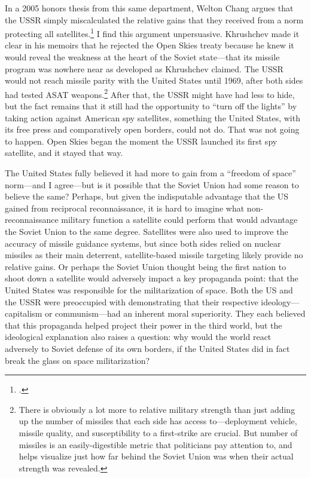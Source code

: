 \documentclass[11pt]{memoir}
\begin{document}
In a 2005 honors thesis from this same department, Welton Chang argues that the USSR simply miscalculated the relative gains that they received from a norm protecting all satellites.\footcite[Welton Chang is now a senior associate at the Center for Strategic and International Studies, and received a Ph.D. in Psychology from the University of Pennsylvania, where he studied judgement and decisionmaking. Professor Valentino provided me with his honors work, and it has been invaluable in shaping my understanding of the politics of satellites and anti-satellite weapons.]{chang_all_2005} I find this argument unpersuasive. Khrushchev made it clear in his memoirs that he rejected the Open Skies treaty because he knew it would reveal the weakness at the heart of the Soviet state---that its missile program was nowhere near as developed as Khrushchev claimed. The USSR would not reach missile parity with the United States until 1969, after both sides had tested ASAT weapons.\footnote{There is obviously a lot more to relative military strength than just adding up the number of missiles that each side has access to---deployment vehicle, missile quality, and susceptibility to a first-strike are crucial. But number of missiles is an easily-digestible metric that politicians pay attention to, and helps visualize just how far behind the Soviet Union was when their actual strength was revealed.} After that, the USSR might have had less to hide, but the fact remains that it still had the opportunity to ``turn off the lights'' by taking action against American spy satellites, something the United States, with its free press and comparatively open borders, could not do. That was not going to happen. Open Skies began the moment the USSR launched its first spy satellite, and it stayed that way.

The United States fully believed it had more to gain from a ``freedom of space'' norm---and I agree---but is it possible that the Soviet Union had some reason to believe the same? Perhaps, but given the indisputable advantage that the US gained from reciprocal reconnaissance, it is hard to imagine what non-reconnaissance military function a satellite could perform that would advantage the Soviet Union to the same degree. Satellites were also used to improve the accuracy of missile guidance systems, but since both sides relied on nuclear missiles as their main deterrent, satellite-based missile targeting likely provide no relative gains. Or perhaps the Soviet Union thought being the first nation to shoot down a satellite would adversely impact a key propaganda point: that the United States was responsible for the militarization of space. Both the US and the USSR were preoccupied with demonstrating that their respective ideology---capitalism or communism---had an inherent moral superiority. They each believed that this propaganda helped project their power in the third world, but the ideological explanation also raises a question: why would the world react adversely to Soviet defense of its own borders, if the United States did in fact break the glass on space militarization?
\end{document}
